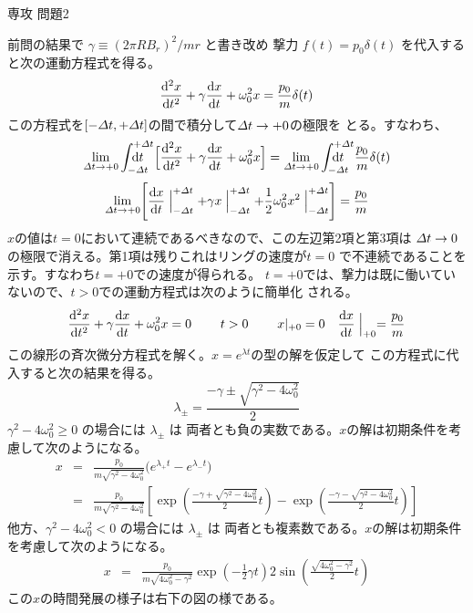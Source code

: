 \documentclass[fleqn]{jbook}
\begin{document}
\begin{answer}{専攻 問題2}{}
\begin{subanswers}
\SubAnswer
  前問の結果で $\gamma\equiv(2\pi R B_r)^2/mr$ と書き改め
  撃力 $f(t)=p_0 \delta(t)$ を代入すると次の運動方程式を得る。
%
  \[ \Deriver{^2 x}{t^2} + \gamma \Deriver{x}{t} + \omega_0^2 x%
     = \frac{p_0}{m} \delta(t) \]
%
  この方程式を$[-{\mit\Delta} t,+{\mit\Delta} t]$の間で積分して${\mit\Delta} t\to+0$の極限を
  とる。すなわち、
%
  \[ \lim_{\IDelta t\to +0} \Dint{-\IDelta t}{+\IDelta t}{\d{t}}\,\,\, \Bigl[ \Deriver{^2 x}{t^2}%
    + \gamma \Deriver{x}{t} + \omega_0^2 x \Bigr]%
    = \lim_{\IDelta t\to +0} \Dint{-\IDelta t}{+\IDelta t}{\d{t}}\,\,\,\frac{p_0}{m}\delta(t)\]
  \[ \lim_{\IDelta t\to +0}  \Biggl[ \Deriver{x}{t}\Bigm|_{-\IDelta t}^{+\IDelta t}%
    + \gamma x \Bigm|_{-\IDelta t}^{+\IDelta t}%
    + \frac{1}{2}\omega_0^2 x^2 \Bigm|_{-\IDelta t}^{+\IDelta t} \Biggr]%
    = \frac{p_0}{m} \]
%
  $x$の値は$t=0$において連続であるべきなので、この左辺第2項と第3項は
  ${\mit\Delta} t\to0$の極限で消える。第1項は残りこれはリングの速度が$t=0$
  で不連続であることを示す。すなわち$t=+0$での速度が得られる。
  $t=+0$では、撃力は既に働いていないので、$t>0$での運動方程式は次のように簡単化
  される。
%
  \[ \Deriver{^2 x}{t^2} + \gamma \Deriver{x}{t} + \omega_0^2 x = 0%
  \hspace{8mm} t>0 \hspace{8mm} x|_{+0}=0 \quad \Deriver{x}{t}\Bigm|_{+0} = \frac{p_0}{m} \]
%
  この線形の斉次微分方程式を解く。$x=e^{\lambda t}$の型の解を仮定して
  この方程式に代入すると次の結果を得る。
%
  \[ \lambda_{\pm}=\frac{-\gamma\pm\sqrt{\gamma^2-4\omega_0^2}}{2} \]
%
  $\gamma^2-4\omega_0^2\ge 0$ の場合には $\lambda_{\pm}$ は
  両者とも負の実数である。$x$の解は初期条件を考慮して次のようになる。
%
  \begin{eqnarray*}
  x &=& \frac{p_0}{m\sqrt{\gamma^2-4\omega_0^2}}%
        \bigl( e^{\lambda_{+}t}-e^{\lambda_{-}t} \bigr) \\
    &=& \frac{p_0}{m\sqrt{\gamma^2-4\omega_0^2}}%
        \left[ \exp{\left(\frac{-\gamma+\sqrt{\gamma^2-4\omega_0^2}}{2}t\right)}-\exp{\left(\frac{-\gamma-\sqrt{\gamma^2-4\omega_0^2}}{2}t\right)} \right]
  \end{eqnarray*}
%
  他方、$\gamma^2-4\omega_0^2<0$ の場合には $\lambda_{\pm}$ は
  両者とも複素数である。$x$の解は初期条件を考慮して次のようになる。
%
  \begin{eqnarray*}
  x &=& \frac{p_0}{m\sqrt{4\omega_0^2-\gamma^2}}%
        \exp{\left(-\frac{1}{2}\gamma t\right)}2\sin{\left(\frac{\sqrt{4\omega_0^2-\gamma^2}}{2}t\right)}
  \end{eqnarray*}
%
  この$x$の時間発展の様子は右下の図の様である。

\end{subanswers}
\end{answer}
\end{document}
